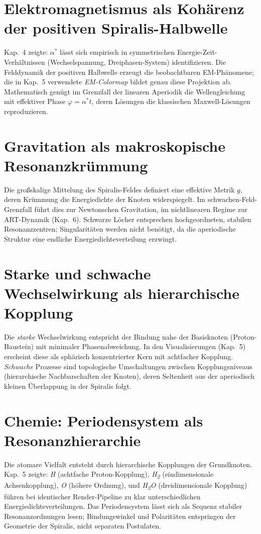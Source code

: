 \section{Elektromagnetismus als Kohärenz der positiven Spiralis-Halbwelle}
\label{sec:alpha-empirie}
Kap.~4 zeigte: \(\alpha^*\) lässt sich empirisch in symmetrischen Energie-Zeit-Verhältnissen (Wechselspannung, Dreiphasen-System) identifizieren. 
Die Felddynamik der positiven Halbwelle erzeugt die beobachtbaren EM-Phänomene; die in Kap.~5 verwendete \emph{EM-Colormap} bildet genau diese Projektion ab. 
Mathematisch genügt im Grenzfall der linearen Aperiodik die Wellengleichung mit effektiver Phase \(\varphi=\alpha^* t\), deren Lösungen die klassischen Maxwell-Lösungen reproduzieren.

\section{Gravitation als makroskopische Resonanzkrümmung}
\label{sec:gravitation}
Die großskalige Mittelung des Spiralis-Feldes definiert eine effektive Metrik \(g\), deren Krümmung die Energiedichte der Knoten widerspiegelt. 
Im schwachen-Feld-Grenzfall führt dies zur Newtonschen Gravitation, im nichtlinearen Regime zur \acrshort{ART}-Dynamik (Kap.~6). 
Schwarze Löcher entsprechen hochgeordneten, stabilen Resonanzzentren; Singularitäten werden nicht benötigt, da die aperiodische Struktur eine endliche Energiedichteverteilung erzwingt.

\section{Starke und schwache Wechselwirkung als hierarchische Kopplung}
\label{sec:stark-schwach}
Die \emph{starke} Wechselwirkung entspricht der Bindung nahe der Basisknoten (Proton-Baustein) mit minimaler Phasenabweichung. 
In den Visualisierungen (Kap.~5) erscheint diese als sphärisch konzentrierter Kern mit achtfacher Kopplung.
\emph{Schwache} Prozesse sind topologische Umschaltungen zwischen Kopplungsniveaus (hierarchische Nachbarschaften der Knoten), 
deren Seltenheit aus der aperiodisch kleinen Überlappung in der Spiralis folgt.

\section{Chemie: Periodensystem als Resonanzhierarchie}
\label{sec:chemie}
Die atomare Vielfalt entsteht durch hierarchische Kopplungen der Grundknoten. 
Kap.~5 zeigte: \textit{H} (achtfache Proton-Kopplung), \textit{H\textsubscript{2}} (eindimensionale Achsenkopplung), \textit{O} (höhere Ordnung), 
und \textit{H\textsubscript{2}O} (dreidimensionale Kopplung) führen bei identischer Render-Pipeline zu klar unterschiedlichen Energiedichteverteilungen.
Das Periodensystem lässt sich als Sequenz stabiler Resonanzordnungen lesen; Bindungswinkel und Polaritäten entspringen der Geometrie der Spiralis, nicht separaten Postulaten.

